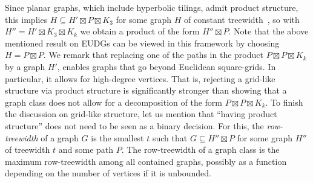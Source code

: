 \documentclass[11pt]{article}
\begin{document}
Since planar graphs, which include hyperbolic tilings, admit product structure, this implies $ H \subseteq H' \boxtimes P \boxtimes K_3 $ for some graph $ H $ of constant treewidth~\cite{dujmovic_planar_2019,dujmovic_planar_2019_conf}, so with $ H'' = H' \boxtimes K_3 \boxtimes K_k $ we obtain a product of the form $ H'' \boxtimes P $.
Note that the above mentioned result on EUDGs can be viewed in this framework by choosing $ H = P \boxtimes P $.
% 
%
We remark that replacing one of the paths in the product $ P \boxtimes P \boxtimes K_k $ by a graph $ H' $, enables graphs that go beyond Euclidean square-grids.
In particular, it allows for high-degree vertices.
That is, rejecting a grid-like structure via product structure is significantly stronger than showing that a graph class does not allow for a decomposition of the form $ P \boxtimes P \boxtimes K_k $.
%
To finish the discussion on grid-like structure, let us mention that \enquote{having product structure} does not need to be seen as a binary decision.
For this, the \emph{row-treewidth} of a graph $ G $ is the smallest $ t $ such that $ G \subseteq H'' \boxtimes P $ for some graph $ H'' $ of treewidth $ t $ and some path $ P $.
The row-treewidth of a graph class is the maximum row-treewidth among all contained graphs, possibly as a function depending on the number of vertices if it is unbounded.
\end{document}

